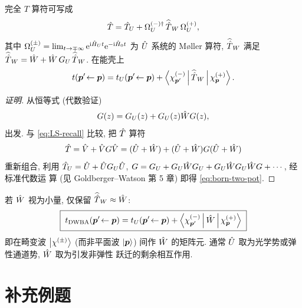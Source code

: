 \begin{theorem}\label{thm:two-pot}
完全 $T$ 算符可写成
\begin{equation}
\hat{T}=\hat{T}_{U}+\Omega_{U}^{(-)\dagger}\,\widehat{\hat{T}}_{W}\,\Omega_{U}^{(+)},
\label{eq:born-two-pot}
\end{equation}
其中 $\Omega_{U}^{(\pm)}=\lim_{t\to\mp\infty}\mathrm{e}^{\mathrm{i}\hat{H}_{U}t}\mathrm{e}^{-\mathrm{i}\hat{H}_{0}t}$
为 $\hat{U}$ 系统的 Møller 算符, $\widehat{\hat{T}}_{W}$ 满足
$\widehat{\hat{T}}_{W}=\hat{W}+\hat{W}\,G_{U}\,\widehat{\hat{T}}_{W}$. 在能壳上
\begin{equation}
t(\bm p'\!\leftarrow\bm p)
=t_{U}(\bm p'\!\leftarrow\bm p)
+\left\langle \chi^{(-)}_{\bm p'} \,\middle|\, \widehat{\hat{T}}_{W} \,\middle|\, \chi^{(+)}_{\bm p} \right\rangle.
\label{eq:born-two-pot-on}
\end{equation}
\end{theorem}

\begin{proof}[证明]
从恒等式 (代数验证)
\begin{equation}
G(z)=G_{U}(z)+G_{U}(z)\hat{W} G(z),
\label{eq:born-resolvent-W}
\end{equation}
出发. 与 \eqref{eq:LS-recall} 比较, 把 $\hat{T}$ 算符
\begin{equation}
\hat{T}=\hat{V}+\hat{V} G\hat{V}=(\hat{U}+\hat{W})+(\hat{U}+\hat{W})G(\hat{U}+\hat{W})
\label{eq:born-T-decomp}
\end{equation}
重新组合, 利用 $\hat{T}_{U}=\hat{U}+\hat{U} G_{U}\hat{U}$,
$G=G_{U}+G_{U}\hat{W} G_{U}+G_{U}\hat{W} G_{U}\hat{W} G+\cdots$, 经标准代数运
算 (见 Goldberger--Watson 第 5 章) 即得 \eqref{eq:born-two-pot}.
\end{proof}

\begin{corollary}\label{cor:dwba-first}
若 $\hat{W}$ 视为小量, 仅保留 $\widehat{\hat{T}}_{W}\approx\hat{W}$:
\begin{equation}
\boxed{\;t_{\text{DWBA}}(\bm p'\!\leftarrow\bm p)
=t_{U}(\bm p'\!\leftarrow\bm p)
+\left\langle \chi^{(-)}_{\bm p'} \,\middle|\, \hat{W} \,\middle|\, \chi^{(+)}_{\bm p} \right\rangle\;}
\label{eq:born-dwba}
\end{equation}
即在畸变波 $\ket{\chi^{(\pm)}}$ (而非平面波 $\ket{\bm p}$) 间作 $\hat{W}$
的矩阵元. 通常 $\hat{U}$ 取为光学势或弹性通道势, $\hat{W}$ 取为引发非弹性
跃迁的剩余相互作用.
\end{corollary}

\section{补充例题}\label{sec:born-examples}

